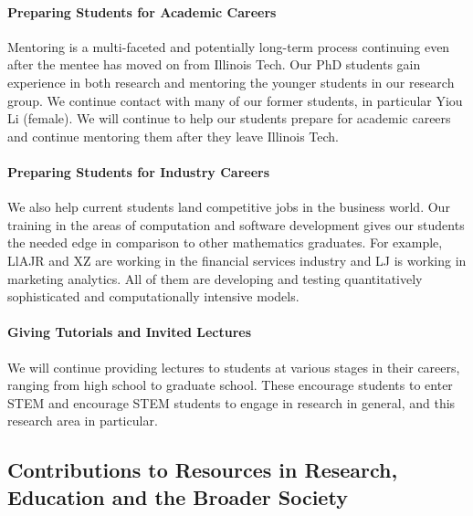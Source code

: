 \documentclass[11pt]{NSFamsart}
\begin{document}
\paragraph*{Preparing Students for Academic Careers} 
Mentoring is a multi-faceted and 
potentially long-term process continuing even after the mentee has moved on from Illinois Tech.  
Our PhD students gain experience in both research and mentoring the younger students in our 
research group.  We 
continue contact with many of our former students, in particular Yiou Li (female).  We will continue to help our students prepare for 
academic careers and continue mentoring them after they leave Illinois Tech.

\paragraph*{Preparing Students for Industry Careers}
We also help current students land 
competitive jobs in the business world. Our training in the areas of computation and software 
development gives our students the needed edge in comparison to other mathematics 
graduates. For example, LlAJR and XZ are working in the financial services industry and  LJ is 
working in marketing analytics.  All of them are developing and testing quantitatively sophisticated and computationally intensive models. 

\paragraph*{Giving Tutorials and Invited Lectures}
We will continue providing lectures to students at various stages in their careers, ranging from high school to graduate school. These encourage students to enter STEM and encourage STEM students 
to engage in research in general, and this research area in particular.


\subsection{Contributions to Resources in Research, Education and the Broader Society} 
\label{BroaderTwoSec}
\end{document}

